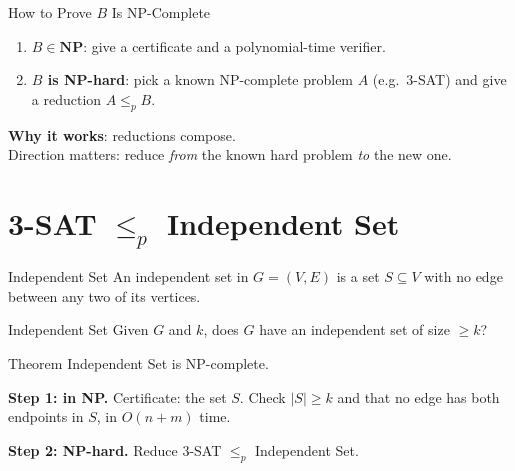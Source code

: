 \documentclass[10pt,aspectratio=169]{beamer}
\begin{document}
\begin{frame}{How to Prove $B$ Is NP-Complete}
  \begin{enumerate}
    \item \textbf{$B \in \mathbf{NP}$}: give a certificate and a
          polynomial-time verifier.
    \item \textbf{$B$ is NP-hard}: pick a known NP-complete problem $A$
          (e.g.\ 3-SAT) and give a reduction $A \le_p B$.
  \end{enumerate}

  \begin{center}
  \end{center}

  \pause
  \textbf{Why it works}: reductions compose. \\
  \alert{Direction matters}: reduce \emph{from} the known hard problem
  \emph{to} the new one.
\end{frame}

\section{3-SAT $\le_p$ Independent Set}

\begin{frame}{Independent Set}
  An \alert{independent set} in $G = (V, E)$ is a set $S \subseteq V$ with no
  edge between any two of its vertices.

  \begin{block}{Independent Set}
    Given $G$ and $k$, does $G$ have an independent set of size $\ge k$?
  \end{block}

  \begin{block}{Theorem}
    Independent Set is NP-complete.
  \end{block}

  \textbf{Step 1: in NP.} Certificate: the set $S$. Check $|S| \ge k$ and
  that no edge has both endpoints in $S$, in $O(n + m)$ time.

  \medskip
  \textbf{Step 2: NP-hard.} Reduce 3-SAT $\le_p$ Independent Set.
\end{frame}
\end{document}
